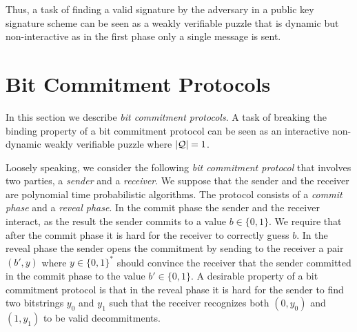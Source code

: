 Thus, a task of finding a valid signature by the adversary in a public key signature scheme can be seen as a weakly verifiable puzzle that
is dynamic but non-interactive as in the first phase only a single message is sent.

\section{Bit Commitment Protocols}
\label{section:bc}
In this section we describe \textit{bit commitment protocols}. A task of breaking the binding property of
a bit commitment protocol can be seen as an interactive non-dynamic weakly verifiable puzzle where $|\mathcal{Q}| = 1$.

Loosely speaking, we consider the following \textit{bit commitment protocol} that involves two parties, a \textit{sender} and a \textit{receiver}.
We suppose that the sender and the receiver are polynomial time probabilistic algorithms.
The protocol consists of a \textit{commit phase} and a \textit{reveal phase}.
In the commit phase the sender and the receiver interact, as the result the sender commits to a value $b \in \{0,1\}$.
We require that after the commit phase it is hard for the receiver to correctly guess $b$.
In the reveal phase the sender opens the commitment by sending to the receiver a pair $(b', y)$ where $y \in \{0,1\}^{*}$
should convince the receiver that the sender committed in the commit phase to the value $b' \in \{0,1\}$.
A desirable property of a bit commitment protocol is that in the reveal phase it is hard for
the sender to find two bitstrings $y_0$ and $y_1$ such that the receiver recognizes both $(0,y_0)$ and $(1, y_1)$ to be valid decommitments.

